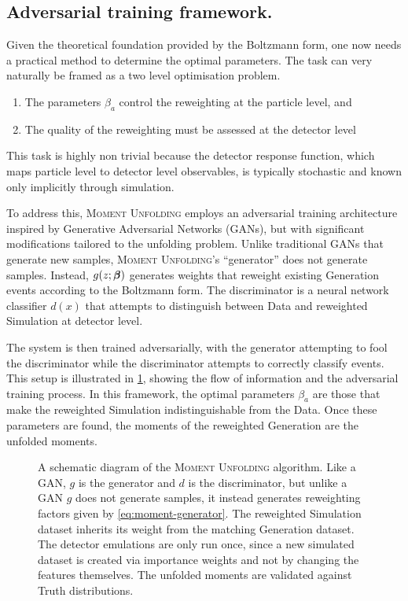     \subsection{Adversarial training framework.}
        Given the theoretical foundation provided by the Boltzmann form, one now needs a practical method to determine the optimal parameters.
        The task can very naturally be framed as a two level optimisation problem.
        \begin{enumerate}
            \item The parameters $\beta_a$ control the reweighting at the particle level, and
            \item The quality of the reweighting must be assessed at the detector level
        \end{enumerate}
        This task is highly non trivial because the detector response function, which maps particle level to detector level observables, is typically stochastic and known only implicitly through simulation.
    
        To address this, \textsc{Moment Unfolding} employs an adversarial training architecture inspired by Generative Adversarial Networks (GANs), but with significant modifications tailored to the unfolding problem.
        Unlike traditional GANs that generate new samples, \textsc{Moment Unfolding}'s ``generator'' does not generate samples.
        Instead, $g(z;\vb*\beta)$ generates weights that reweight existing Generation events according to the Boltzmann form.
        The discriminator is a neural network classifier $d(x)$ that attempts to distinguish between Data and reweighted Simulation at detector level.

        The system is then trained adversarially, with the generator attempting to fool the discriminator while the discriminator attempts to correctly classify events.
        This setup is illustrated in \cref{fig:schematic}, showing the flow of information and the adversarial training process.
        In this framework, the optimal parameters $\beta_a$ are those that make the reweighted Simulation indistinguishable from the Data.
        Once these parameters are found, the moments of the reweighted Generation are the unfolded moments.
    \begin{figure}
        \centering
        \resizebox{\textwidth}{!}{}
    \caption[Schematic diagram of \textsc{Moment Unfolding}]{
    A schematic diagram of the \textsc{Moment Unfolding} algorithm.
    Like a GAN, $g$ is the generator and $d$ is the discriminator, but unlike a GAN $g$ does not generate samples, it instead generates reweighting factors given by \cref{eq:moment-generator}. 
    The reweighted Simulation dataset inherits its weight from the matching Generation dataset.  The detector emulations are only run once, since a new simulated dataset is created via importance weights and not by changing the features themselves.
    The unfolded moments are validated against Truth distributions.}

        \label{fig:schematic}
    \end{figure}   
